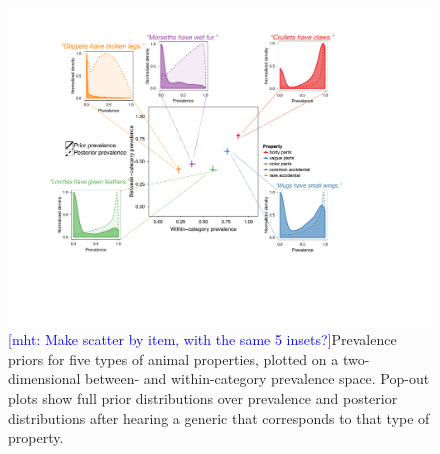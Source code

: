 \documentclass[10pt,letterpaper]{article}
\newcommand{\mht}[1]{\textcolor{Blue}{[mht: #1]}}
\begin{document}




\begin{figure}
\centering
    \includegraphics[width=1\columnwidth]{prevalence-asymmetry-scatterwDists.pdf}
    \caption{\mht{Make scatter by item, with the same 5 insets?}Prevalence priors for five types of animal properties, plotted on a two-dimensional between- and within-category prevalence space. 
    Pop-out plots show full prior distributions over prevalence and posterior distributions after hearing a generic that corresponds to that type of property. }
  \label{fig:prior2}
\end{figure}
\end{document}
